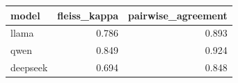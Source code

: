 \begin{tabular}{lrr}
\toprule
model & fleiss_kappa & pairwise_agreement \\
\midrule
llama & 0.786 & 0.893 \\
qwen & 0.849 & 0.924 \\
deepseek & 0.694 & 0.848 \\
\bottomrule
\end{tabular}
